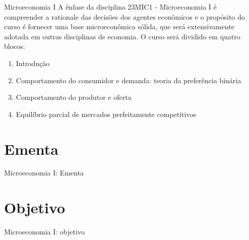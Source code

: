 \documentclass[10pt]{beamer}
\begin{document}
\begin{frame}{Microeconomia I}
    A ênfase da disciplina 23MIC1 - Microeconomia I é compreender a rationale das decisões dos agentes econômicos e o propósito do curso é fornecer uma base microeconômica sólida, que será extensivamente adotada em outras disciplinas de economia. O curso será dividido em quatro blocos:\bigskip
    \begin{enumerate}
        \item Introdução \medskip
        \item Comportamento do consumidor e demanda: teoria da preferência binária \medskip
        \item Comportamento do produtor e oferta\medskip
        \item Equilíbrio parcial de mercados perfeitamente competitivos
    \end{enumerate}
\end{frame}

\section{Ementa}
\begin{frame}{Microeconomia I: Ementa}
    \begin{center}
        \begin{minipage}{.9\textwidth}
        \end{minipage}
    \end{center}

\end{frame}

\section{Objetivo}
\begin{frame}{Microeconomia I: objetivo}
    \begin{center}
        \begin{minipage}{.9\textwidth}
        \end{minipage}
    \end{center}
\end{frame}
\end{document}
